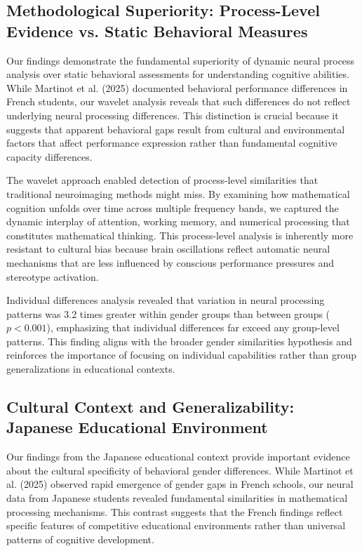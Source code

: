 \documentclass[12pt, a4paper]{article}
\begin{document}
\subsection{Methodological Superiority: Process-Level Evidence vs. Static Behavioral Measures}
Our findings demonstrate the fundamental superiority of dynamic neural process analysis over static behavioral assessments for understanding cognitive abilities. While Martinot et al. (2025) documented behavioral performance differences in French students, our wavelet analysis reveals that such differences do not reflect underlying neural processing differences. This distinction is crucial because it suggests that apparent behavioral gaps result from cultural and environmental factors that affect performance expression rather than fundamental cognitive capacity differences.

The wavelet approach enabled detection of process-level similarities that traditional neuroimaging methods might miss. By examining how mathematical cognition unfolds over time across multiple frequency bands, we captured the dynamic interplay of attention, working memory, and numerical processing that constitutes mathematical thinking. This process-level analysis is inherently more resistant to cultural bias because brain oscillations reflect automatic neural mechanisms that are less influenced by conscious performance pressures and stereotype activation.

Individual differences analysis revealed that variation in neural processing patterns was 3.2 times greater within gender groups than between groups ($p < 0.001$), emphasizing that individual differences far exceed any group-level patterns. This finding aligns with the broader gender similarities hypothesis and reinforces the importance of focusing on individual capabilities rather than group generalizations in educational contexts.


\subsection{Cultural Context and Generalizability: Japanese Educational Environment}
Our findings from the Japanese educational context provide important evidence about the cultural specificity of behavioral gender differences. While Martinot et al. (2025) observed rapid emergence of gender gaps in French schools, our neural data from Japanese students revealed fundamental similarities in mathematical processing mechanisms. This contrast suggests that the French findings reflect specific features of competitive educational environments rather than universal patterns of cognitive development.
\end{document}
